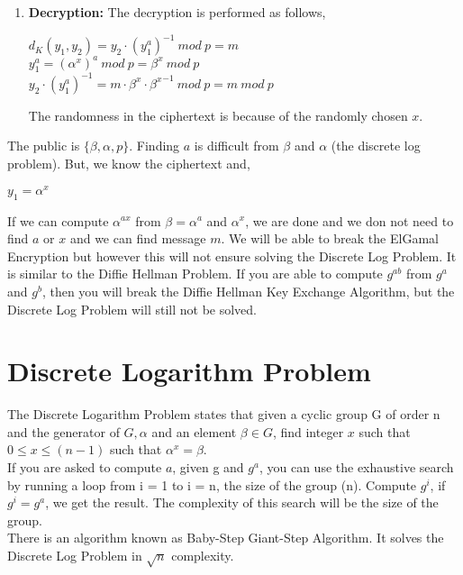 \documentclass[11pt]{article}
\begin{document}
\begin{enumerate}
    \item \textbf{Decryption:} The decryption is performed as follows,
    \begin{center}
        $d_K(y_1, y_2) = y_2 \cdot {(y_1^a)}^{-1} \ mod \ p = m$\\
        \vspace{1mm}
        $y_1^a = {(\alpha^x)}^a \ mod \ p = \beta^x \ mod \ p$\\
        \vspace{1mm}
        ${y_2 \cdot (y_1^a)}^{-1} = m \cdot \beta^x \cdot {\beta^x}^{-1} \ mod \ p = m \ mod \ p$\\
    \end{center}
    The randomness in the ciphertext is because of the randomly chosen $x$.
\end{enumerate}
The public is $\{\beta, \alpha, p\}$. Finding $a$ is difficult from $\beta$ and $\alpha$ (the discrete log problem). But, we know the ciphertext and,
\begin{center}
    $y_1 = \alpha^x$
\end{center}
If we can compute $\alpha^{ax}$ from $\beta = \alpha^a$ and $\alpha^x$, we are done and we don not need to find $a$ or $x$ and we can find message $m$. We will be able to break the ElGamal Encryption but however this will not ensure solving the Discrete Log Problem. It is similar to the Diffie Hellman Problem. If you are able to compute $g^{ab}$ from $g^a$ and $g^b$, then you will break the Diffie Hellman Key Exchange Algorithm, but the Discrete Log Problem will still not be solved.

\section{Discrete Logarithm Problem}
The Discrete Logarithm Problem states that given a cyclic group G of order n and the generator of $G, \alpha$ and an element $\beta \in G$, find integer $x$ such that $0 \leq x \leq (n-1)$ such that $\alpha^x = \beta$.\\
\newline
If you are asked to compute $a$, given g and $g^a$, you can use the exhaustive search by running a loop from i =  1 to i = n, the size of the group (n). Compute $g^i$, if $g^i = g^a$, we get the result. The complexity of this search will be the size of the group.\\
\newline 
There is an algorithm known as Baby-Step Giant-Step Algorithm. It solves the Discrete Log Problem in $\sqrt{n}$ complexity.
\end{document}
